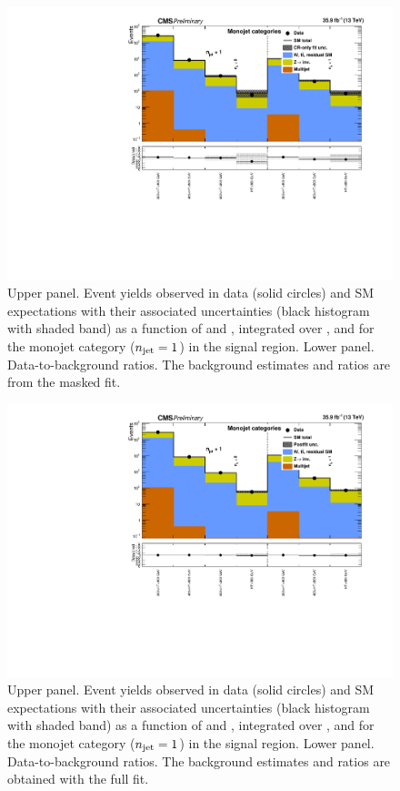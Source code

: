 \clearpage
\begin{figure}[h!]
  \centering
  \caption{Upper panel. Event yields observed in data (solid circles)
    and SM expectations with their associated uncertainties (black
    histogram with shaded band) as a function of \nb and \scalht,
    integrated over \mht, and for the monojet category ($n_{\text{jet}} = 1$)
    in the signal region. Lower panel. Data-to-background ratios. The
    background estimates and ratios are from the masked fit. }
  \label{fig:mr_mono_pre}
  \includegraphics[width=1.\linewidth]{figures/results/36invfb/mono/summaryPlot_Monojet_prefit}
\end{figure}

\clearpage
\begin{figure}[h!]
  \centering
  \caption{Upper panel. Event yields observed in data (solid circles)
    and SM expectations with their associated uncertainties (black
    histogram with shaded band) as a function of \nb and \scalht,
    integrated over \mht, and for the monojet category ($n_{\text{jet}} = 1$)
    in the signal region. Lower panel. Data-to-background ratios. The
    background estimates and ratios are obtained with the full fit. }
  \label{fig:mr_mono_post}
  \includegraphics[width=1.\linewidth]{figures/results/36invfb/mono/summaryPlot_Monojet_fit_b}
\end{figure}

